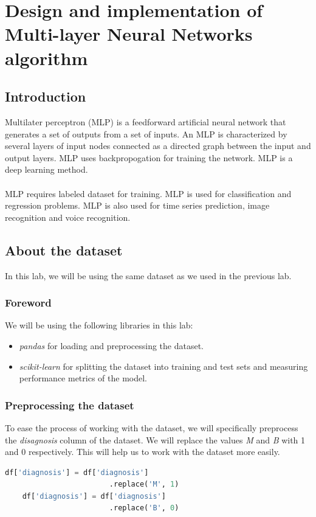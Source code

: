 \chapter{Design and implementation of Multi-layer
Neural Networks algorithm}
\section{Introduction}
Multilater perceptron (MLP) is a feedforward artificial neural network that generates a set of outputs from a set of inputs. An MLP is characterized by several layers of input nodes connected as a directed graph between the input and output layers. MLP uses backpropogation for training the network. MLP is a deep learning method.\\\\
MLP requires labeled dataset for training. MLP is used for classification and regression problems. MLP is also used for time series prediction, image recognition and voice recognition.\\

\section{About the dataset}
In this lab, we will be using the same dataset as we used in the previous lab.\\
\subsection{Foreword}
We will be using the following libraries in this lab:
\begin{itemize}
    \item \textit{pandas} for loading and preprocessing the dataset.
    \item \textit{scikit-learn} for splitting the dataset into training and test sets and measuring performance metrics of the model.
\end{itemize}
\subsection{Preprocessing the dataset}
To ease the process of working with the dataset, we will specifically preprocess the \textit{disagnosis} column of the dataset. We will replace the values \textit{M} and \textit{B} with 1 and 0 respectively. This will help us to work with the dataset more easily.
\begin{lstlisting}[language=Python]
    df['diagnosis'] = df['diagnosis']
                        .replace('M', 1)
    df['diagnosis'] = df['diagnosis']
                        .replace('B', 0)
\end{lstlisting}
